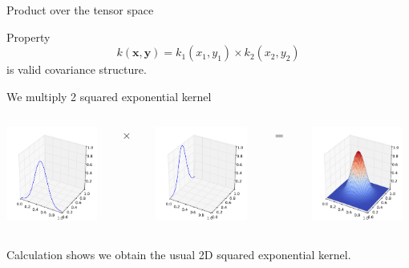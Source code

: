 \documentclass{beamer}
\begin{document}
\begin{frame}{Product over the tensor space}
\begin{block}{Property}
\begin{equation*}
k(\textbf{x},\textbf{y}) = k_1(x_1,y_1) \times k_2(x_2,y_2)
\end{equation*}
is valid covariance structure.
\end{block}
\begin{example}
We multiply 2 squared exponential kernel
\begin{columns}[c]
\begin{column}{3cm}
\includegraphics[width=3cm]{figures/python/newfromold-sum2-k1}
\end{column}
\begin{column}{2mm}
$\times $
\end{column}
\begin{column}{3cm}
\includegraphics[width=3cm]{figures/python/newfromold-sum2-k2}
\end{column}
\begin{column}{2mm}
$=$
\end{column}
\begin{column}{3cm}
\includegraphics[width=3cm]{figures/python/newfromold-prod2-k12}
\end{column}
\end{columns}
\vspace{5mm}
Calculation shows we obtain the usual 2D squared exponential kernel.
\end{example}
\end{frame}
\end{document}
